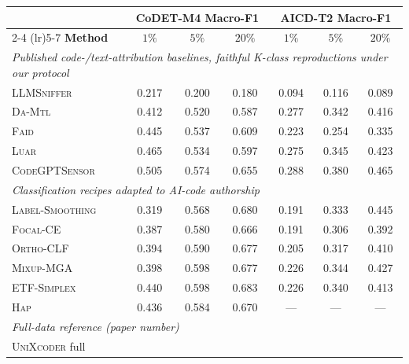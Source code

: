 ﻿\documentclass[11pt]{article}
\begin{document}
\begin{table}[t]
\centering
\small
\setlength{\tabcolsep}{4pt}
\begin{tabular}{l ccc ccc}
\toprule
& \multicolumn{3}{c}{\textbf{CoDET-M4} Macro-F1}
& \multicolumn{3}{c}{\textbf{AICD-T2} Macro-F1} \\
\cmidrule(lr){2-4} \cmidrule(lr){5-7}
\textbf{Method}
& $1\%$ & $5\%$ & $20\%$ & $1\%$ & $5\%$ & $20\%$ \\
\midrule
\multicolumn{7}{l}{\emph{Published code-/text-attribution baselines, faithful K-class reproductions under our protocol}} \\
\textsc{LLMSniffer}~\citep{llmsniffer2024}
                                           & 0.217 & 0.200 & 0.180 & 0.094 & 0.116 & 0.089 \\
\textsc{Da-Mtl}~\citep{damtl2025}          & 0.412 & 0.520 & 0.587 & 0.277 & 0.342 & 0.416 \\
\textsc{Faid}~\citep{orel2025droid}        & 0.445 & 0.537 & 0.609 & 0.223 & 0.254 & 0.335 \\
\textsc{Luar}~\citep{luar2024}             & 0.465 & 0.534 & 0.597 & 0.275 & 0.345 & 0.423 \\
\textsc{CodeGPTSensor}~\citep{xu2025codegptsensor}
                                           & 0.505 & 0.574 & 0.655 & 0.288 & 0.380 & 0.465 \\
\midrule
\multicolumn{7}{l}{\emph{Classification recipes adapted to AI-code authorship}} \\
\textsc{Label-Smoothing}~\citep{guo2022unixcoder}
                                           & 0.319 & 0.568 & 0.680 & 0.191 & 0.333 & 0.445 \\
\textsc{Focal-CE}                          & 0.387 & 0.580 & 0.666 & 0.191 & 0.306 & 0.392 \\
\textsc{Ortho-CLF}~\citep{galanti2025hncoe}
                                           & 0.394 & 0.590 & 0.677 & 0.205 & 0.317 & 0.410 \\
\textsc{Mixup-MGA}                         & 0.398 & 0.598 & 0.677 & 0.226 & 0.344 & 0.427 \\
\textsc{ETF-Simplex}~\citep{galanti2025hncoe}
                                           & 0.440 & 0.598 & 0.683 & 0.226 & 0.340 & 0.413 \\
\textsc{Hap}                               & 0.436 & 0.584 & 0.670 & --- & --- & --- \\
\midrule
\multicolumn{7}{l}{\emph{Full-data reference (paper number)}} \\
\textsc{UniXcoder} full~\citep{orel2025codetm4}

\end{tabular}
\end{table}
\end{document}
